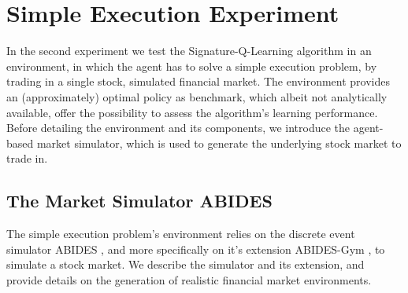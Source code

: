 \documentclass[
    a4paper,
    11pt,
    bibliography=totoc,
    listof=totoc,      
    headinclude=true,
    cleardoublepage=empty,
]{scrbook}
\theoremstyle{plain}
\theoremstyle{definition}
\theoremstyle{remark}
\begin{document}
\section{Simple Execution Experiment}
\label{chapter:Experiments:section:Execution}

In the second experiment we test the Signature-Q-Learning algorithm in an
environment, in which the agent has to solve a simple execution problem, by
trading in a single stock, simulated financial market. The environment 
provides an (approximately) optimal policy as benchmark, which albeit not 
analytically available, offer the possibility to assess the algorithm's 
learning performance. Before detailing the environment and its components, we 
introduce the agent-based market simulator, which is used to
generate the underlying stock market to trade in.

\subsection{The Market Simulator ABIDES}
\label{chapter:Experiments:section:Execution:sub:ABIDES}

The simple execution problem's environment relies on the discrete event
simulator ABIDES \cite{byrd2020_athmms}, and more specifically on it's
extension ABIDES-Gym \cite{amrouni2022_aemdesafm}, to simulate a stock market.
We describe the simulator and its extension, and provide details on the
generation of realistic financial market environments. 
\end{document}
